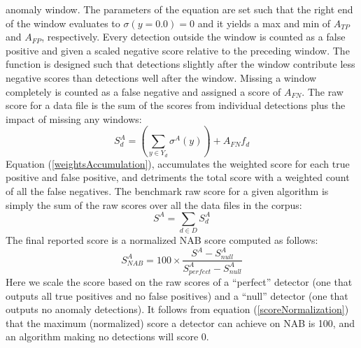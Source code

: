 \documentclass[12pt]{article}
\begin{document}
anomaly window. The parameters of the equation are set such that
the right end of the window evaluates to $\sigma(y = 0.0) = 0$ and it yields a max and min of $A_{TP}$ and $A_{FP}$, respectively. Every detection outside the window is counted as
a false positive and given a scaled negative score relative to the
preceding window. The function is designed such that
detections slightly after the window contribute less negative
scores than detections well after the window. Missing a
window completely is counted as a false negative and assigned
a score of $A_{FN}$. The raw score for a data file is the sum of the scores from
individual detections plus the impact of missing any windows:
\begin{equation}
S^A_d = (\sum_{y \in Y_d} \sigma^A(y)) + A_{FN}f_d
\label{weightsAccumulation}
\end{equation}
Equation (\ref{weightsAccumulation}), accumulates the weighted score for each true positive
and false positive, and detriments the total score with a
weighted count of all the false negatives. The benchmark raw score for a given algorithm is simply the sum of the raw scores
over all the data files in the corpus:
\begin{equation}
S^A = \sum_{d \in D} S^A_d
\label{allScore}
\end{equation}
The final reported score is a normalized NAB score computed as follows:
\begin{equation}
S^A_{NAB} = 100 \times \frac{S^A - S^A_{null}}{S^A_{perfect} - S^A_{null}}
\label{scoreNormalization}
\end{equation}
Here we scale the score based on the raw scores of a “perfect”
detector (one that outputs all true positives and no false
positives) and a “null” detector (one that outputs no anomaly
detections). It follows from equation (\ref{scoreNormalization}) that the maximum (normalized) score a detector can achieve on NAB is 100, and an algorithm making no detections will score 0.
\end{document}
